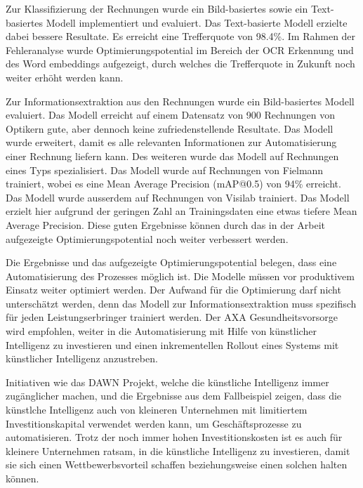 {    Zur Klassifizierung der Rechnungen wurde ein Bild-basiertes sowie ein Text-basiertes Modell implementiert und evaluiert. Das Text-basierte Modell erzielte dabei bessere Resultate. Es erreicht eine Trefferquote von 98.4\%. Im Rahmen der Fehleranalyse wurde Optimierungspotential im Bereich der OCR Erkennung und des Word embeddings aufgezeigt, durch welches die Trefferquote in Zukunft noch weiter erhöht werden kann.
    
    Zur Informationsextraktion aus den Rechnungen wurde ein Bild-basiertes Modell evaluiert. Das Modell erreicht auf einem Datensatz von 900 Rechnungen von Optikern gute, aber dennoch keine zufriedenstellende Resultate. Das Modell wurde erweitert, damit es alle relevanten Informationen zur Automatisierung einer Rechnung liefern kann. Des weiteren wurde das Modell auf Rechnungen eines Typs spezialisiert. Das Modell wurde auf Rechnungen von Fielmann trainiert, wobei es eine Mean Average Precision (mAP@0.5) von 94\% erreicht. Das Modell wurde ausserdem auf Rechnungen von Visilab trainiert. Das Modell erzielt hier aufgrund der geringen Zahl an Trainingsdaten eine etwas tiefere Mean Average Precision. Diese guten Ergebnisse können durch das in der Arbeit aufgezeigte Optimierungspotential noch weiter verbessert werden. 
    
    Die Ergebnisse und das aufgezeigte Optimierungspotential belegen, dass eine Automatisierung des Prozesses möglich ist. Die Modelle müssen vor produktivem Einsatz weiter optimiert werden. Der Aufwand für die Optimierung darf nicht unterschätzt werden, denn das Modell zur Informationsextraktion muss spezifisch für jeden Leistungserbringer trainiert werden. Der AXA Gesundheitsvorsorge wird empfohlen, weiter in die Automatisierung mit Hilfe von künstlicher Intelligenz zu investieren und einen inkrementellen Rollout eines Systems mit künstlicher Intelligenz anzustreben.
    
    Initiativen wie das DAWN Projekt, welche die künstliche Intelligenz immer zugänglicher machen, und die Ergebnisse aus dem Fallbeispiel zeigen, dass die künstlche Intelligenz auch von kleineren Unternehmen mit limitiertem Investitionskapital verwendet werden kann, um Geschäftsprozesse zu automatisieren. Trotz der noch immer hohen Investitionskosten ist es auch für kleinere Unternehmen ratsam, in die künstliche Intelligenz zu investieren, damit sie sich einen Wettbewerbsvorteil schaffen beziehungsweise einen solchen halten können.
}

\newpage
\null
\cleardoublepage

\renewcommand{\baselinestretch}{1.05}
\tableofcontents
\renewcommand{\baselinestretch}{1.15}

\newpage
\null
\cleardoublepage
{}
\cleardoublepage


